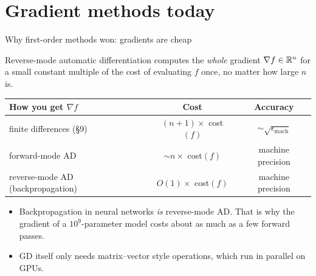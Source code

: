 \section{Gradient methods today}

\begin{frame}{Why first-order methods won: gradients are cheap}
  \begin{thmbox}
    Reverse-mode automatic differentiation computes the \emph{whole} gradient $\nabla f\in\mathbb{R}^n$ for a small constant
    multiple of the cost of evaluating $f$ once, \alert{no matter how large $n$ is}.
  \end{thmbox}
  \vspace{2pt}
  \centering\small
  \begin{tabular}{@{}l c c@{}}
    \toprule
    How you get $\nabla f$ & Cost & Accuracy \\
    \midrule
    finite differences (\S9) & $(n+1)\times$ cost$(f)$ & $\sim\sqrt{\epsilon_{\text{mach}}}$ \\
    forward-mode AD & $\sim n\times$ cost$(f)$ & machine precision \\
    reverse-mode AD (backpropagation) & $O(1)\times$ cost$(f)$ & machine precision \\
    \bottomrule
  \end{tabular}

  \raggedright
  \begin{itemize}\footnotesize
    \item Backpropagation in neural networks \emph{is} reverse-mode AD. That is why the gradient of a $10^9$-parameter
          model costs about as much as a few forward passes.
    \item GD itself only needs matrix--vector style operations, which run in parallel on GPUs.
  \end{itemize}
\end{frame}

